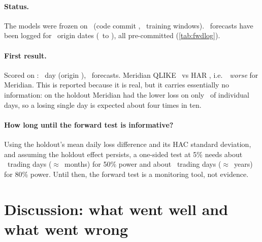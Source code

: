 \documentclass[11pt,a4paper]{article}
\begin{document}
\paragraph{Status.} The models were frozen on \FwdFrozen\ (code commit \texttt{\FwdCommit},
\FwdTrainRows\ training windows). \FwdLogged\ forecasts have been logged for \FwdOrigins\ origin dates
(\FwdFirstOrigin\ to \FwdLastOrigin), all pre-committed (\cref{tab:fwdlog}).



\paragraph{First result.} Scored on \FwdScoredAt: \FwdScoredDates\ day (origin \FwdScoredOrigin),
\FwdScoredN\ forecasts. Meridian QLIKE \FwdQM\ vs HAR \FwdQH, i.e.\ \FwdPct\ \emph{worse} for Meridian.
This is reported because it is real, but it carries essentially no information: on the holdout Meridian
had the lower loss on only \ShareDay\ of individual days, so a losing single day is expected about
four times in ten.

\paragraph{How long until the forward test is informative?} Using the holdout's mean daily loss
difference and its HAC standard deviation, and assuming the holdout effect persists, a one-sided test
at 5\% needs about \PowerFifty\ trading days ($\approx$\PowerFiftyMonths\ months) for 50\% power and about
\PowerEighty\ trading days ($\approx$\PowerEightyYears\ years) for 80\% power. Until then, the forward
test is a monitoring tool, not evidence.

\section{Discussion: what went well and what went wrong}\label{sec:discussion}
\end{document}
